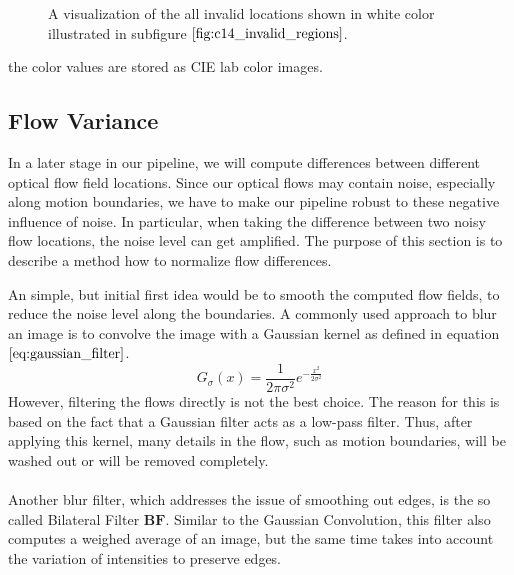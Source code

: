 \begin{figure}[H]
\begin{center}
\end{center}
\caption[Occluded Regions]{A visualization of the all invalid locations shown in white color illustrated in subfigure $\ref{fig:c14_invalid_regions}$.}
\label{fig:invalid_regions}
\end{figure}

the color values are stored as CIE lab color images.

\subsection{Flow Variance}

In a later stage in our pipeline, we will compute differences between different optical flow field locations. Since our optical flows may contain noise, especially along motion boundaries, we have to make our pipeline robust to these negative influence of noise. In particular, when taking the difference between two noisy flow locations, the noise level can get amplified. The purpose of this section is to describe a method how to normalize flow differences. 

An simple, but initial first idea would be to smooth the computed flow fields, to reduce the noise level along the boundaries. A commonly used approach to blur an image is to convolve the image with a Gaussian kernel as defined in equation $\ref{eq:gaussian_filter}$.
\begin{equation}
	G_{\sigma}\left( x \right) = \frac{1}{2 \pi \sigma^2} e^{-\frac{x^2}{2 \sigma^2}}
\label{eq:gaussian_filter}
\end{equation}
However, filtering the flows directly is not the best choice. The reason for this is based on the fact that a Gaussian filter acts as a low-pass filter. Thus, after applying this kernel, many details in the flow, such as motion boundaries, will be washed out or will be removed completely. \\ \\
Another blur filter, which addresses the issue of smoothing out edges, is the so called Bilateral Filter $\textbf{BF}$. Similar to the Gaussian Convolution, this filter also computes a weighed average of an image, but the same time takes into account the variation of intensities to preserve edges. 

